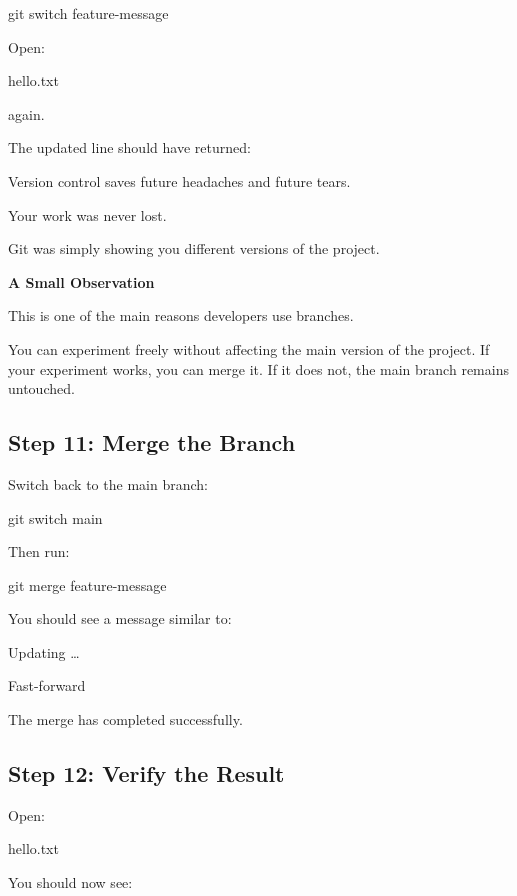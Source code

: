 \documentclass{csc2059practical}
\begin{document}
\begin{terminalplain}
git switch feature-message
\end{terminalplain}
Open:

\begin{terminalplain}
hello.txt
\end{terminalplain}
again.

The updated line should have returned:

\begin{terminalplain}
Version control saves future headaches and future tears.
\end{terminalplain}
Your work was never lost.

Git was simply showing you different versions of the project.

\begin{tipbox}
\textbf{A Small Observation}\par
\medskip
This is one of the main reasons developers use branches.

You can experiment freely without affecting the main version of the project. If your experiment works, you can merge it. If it does not, the main branch remains untouched.
\end{tipbox}

\subsection{Step 11: Merge the Branch}
Switch back to the main branch:

\begin{terminalplain}
git switch main
\end{terminalplain}
Then run:

\begin{terminalplain}
git merge feature-message
\end{terminalplain}
You should see a message similar to:

\begin{terminalplain}
Updating \ldots{}

Fast-forward
\end{terminalplain}
The merge has completed successfully.

\subsection{Step 12: Verify the Result}
Open:

\begin{terminalplain}
hello.txt
\end{terminalplain}
You should now see:
\end{document}

